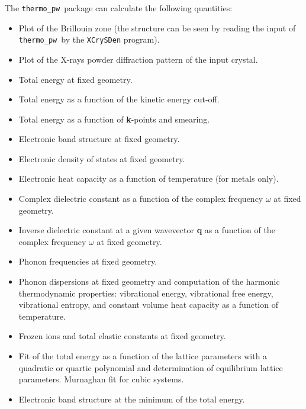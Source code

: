 \documentclass[12pt,a4paper]{article}
\def\thermo{\texttt{thermo\_pw}}
\begin{document}
The \thermo\ package can calculate the following quantities:
\begin{itemize}
\item Plot of the Brillouin zone (the structure can be seen by reading the
input of \thermo\ by the \texttt{XCrySDen} program).

\item Plot of the X-rays powder diffraction pattern of the input crystal.

\item Total energy at fixed geometry.

\item Total energy as a function of the kinetic energy cut-off.

\item Total energy as a function of {\bf k}-points and smearing.

\item Electronic band structure at fixed geometry.

\item Electronic density of states at fixed geometry.

\item Electronic heat capacity as a function of temperature (for metals only).

\item Complex dielectric constant as a function of the complex
frequency $\omega$ at fixed geometry.

\item Inverse dielectric constant at a given wavevector {\bf q} as a function 
of the complex frequency $\omega$ at fixed geometry.

\item Phonon frequencies at fixed geometry.

\item Phonon dispersions at fixed geometry and computation of the harmonic
thermodynamic properties: vibrational energy, vibrational free energy,
vibrational entropy, and constant volume heat capacity as a function of
temperature.

\item Frozen ions and total elastic constants at fixed geometry.

\item Fit of the total energy as a function of the lattice parameters with
a quadratic or quartic polynomial and determination of equilibrium lattice 
parameters.  Murnaghan fit for cubic systems.

\item Electronic band structure at the minimum of the total energy.


\end{itemize}
\end{document}
